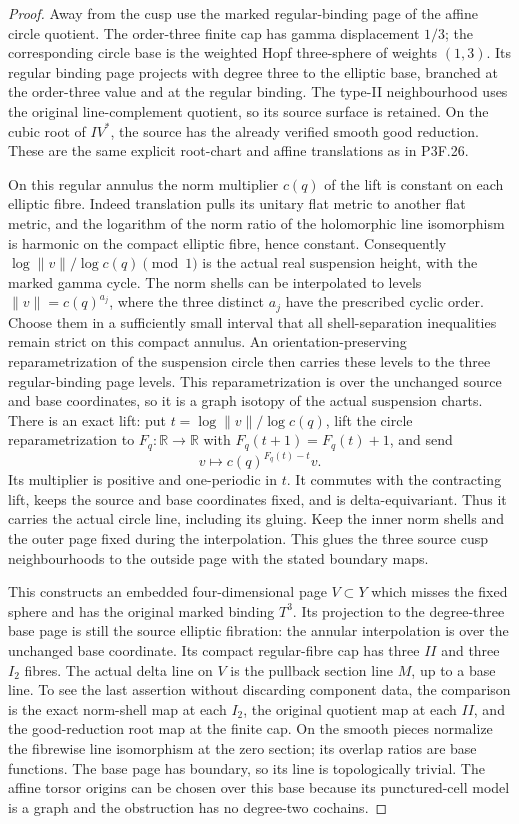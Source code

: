 \begin{proof}
Away from the cusp use the marked regular-binding page of the affine circle quotient. The order-three finite cap has gamma displacement \(1/3\); the corresponding circle base is the weighted Hopf three-sphere of weights \((1,3)\). Its regular binding page projects with degree three to the elliptic base, branched at the order-three value and at the regular binding. The type-II neighbourhood uses the original line-complement quotient, so its source surface is retained. On the cubic root of \(IV^*\), the source has the already verified smooth good reduction. These are the same explicit root-chart and affine translations as in P3F.26.

On this regular annulus the norm multiplier \(c(q)\) of the lift is constant on each elliptic fibre. Indeed translation pulls its unitary flat metric to another flat metric, and the logarithm of the norm ratio of the holomorphic line isomorphism is harmonic on the compact elliptic fibre, hence constant. Consequently \(\log\|v\|/\log c(q)\pmod1\) is the actual real suspension height, with the marked gamma cycle. The norm shells can be interpolated to levels \(\|v\|=c(q)^{a_j}\), where the three distinct \(a_j\) have the prescribed cyclic order. Choose them in a sufficiently small interval that all shell-separation inequalities remain strict on this compact annulus. An orientation-preserving reparametrization of the suspension circle then carries these levels to the three regular-binding page levels. This reparametrization is over the unchanged source and base coordinates, so it is a graph isotopy of the actual suspension charts. There is an exact lift: put \(t=\log\|v\|/\log c(q)\), lift the circle reparametrization to \(F_q:\mathbb R\to\mathbb R\) with \(F_q(t+1)=F_q(t)+1\), and send \[
 v\longmapsto c(q)^{F_q(t)-t}v.
\] Its multiplier is positive and one-periodic in \(t\). It commutes with the contracting lift, keeps the source and base coordinates fixed, and is delta-equivariant. Thus it carries the actual circle line, including its gluing. Keep the inner norm shells and the outer page fixed during the interpolation. This glues the three source cusp neighbourhoods to the outside page with the stated boundary maps.

This constructs an embedded four-dimensional page \(V\subset Y\) which misses the fixed sphere and has the original marked binding \(T^3\). Its projection to the degree-three base page is still the source elliptic fibration: the annular interpolation is over the unchanged base coordinate. Its compact regular-fibre cap has three \(II\) and three \(I_2\) fibres. The actual delta line on \(V\) is the pullback section line \(M\), up to a base line. To see the last assertion without discarding component data, the comparison is the exact norm-shell map at each \(I_2\), the original quotient map at each \(II\), and the good-reduction root map at the finite cap. On the smooth pieces normalize the fibrewise line isomorphism at the zero section; its overlap ratios are base functions. The base page has boundary, so its line is topologically trivial. The affine torsor origins can be chosen over this base because its punctured-cell model is a graph and the obstruction has no degree-two cochains.


\end{proof}
